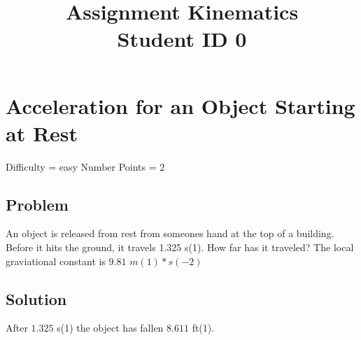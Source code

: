 \documentclass{article}
\title{Assignment Kinematics \\ Student ID 0}
\begin{document}
\maketitle

\section{Acceleration for an Object Starting at Rest}
Difficulty = easy
Number Points = 2
\subsection{Problem}
An object is released from rest from someones hand at the top of a building. Before it hits the ground, it travels 1.325 s(1). How far has it traveled? The local graviational constant is $9.81$ $m(1)*s(-2)$
\subsection{Solution}
After $1.325$ s(1) the object has fallen $8.611$ ft(1).
\end{document}
